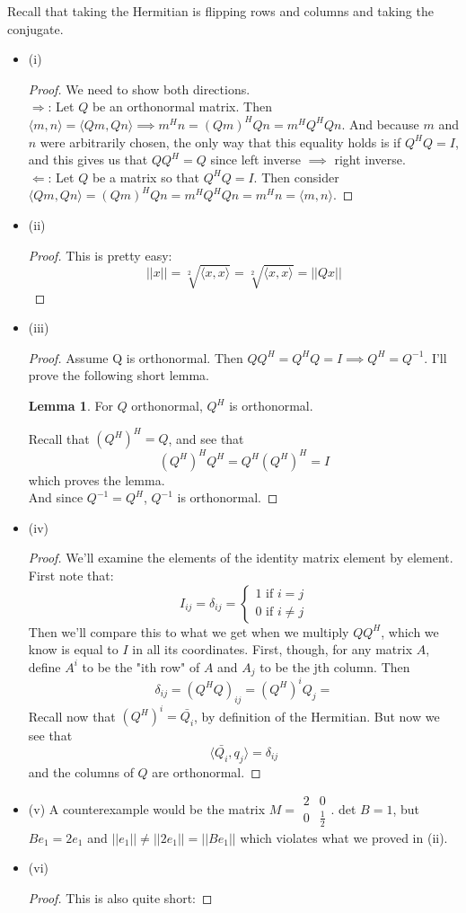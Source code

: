 \documentclass[12pt]{article}
\newenvironment{problem}[2][Problem]{\begin{trivlist}
\item[\hskip \labelsep {\bfseries #1}\hskip \labelsep {\bfseries #2.}]}{\end{trivlist}}
\theoremstyle{definition}
\theoremstyle{definition}
\newtheorem{lemma}{Lemma}[section]
\theoremstyle{definition}
\theoremstyle{definition}
\begin{document}
\begin{problem}{3.10} Recall that taking the Hermitian is flipping rows and columns and taking the conjugate.
\begin{itemize}
\item (i) \begin{proof}
We need to show both directions. \\
$\Rightarrow$: Let $Q$ be an orthonormal matrix. Then $\langle m, n \rangle = \langle Qm, Qn \rangle \implies m^H n = (Qm)^H Qn = m^H Q^H Qn.$ And because $m$ and $n$ were arbitrarily chosen, the only way that this equality holds is if $Q^HQ = I$, and this gives us that $QQ^H = Q$ since left inverse $\implies$ right inverse.  \\
$\Leftarrow$: Let $Q$ be a matrix so that $Q^HQ = I$. Then consider $\langle Qm, Qn \rangle = (Qm)^H Qn = m^HQ^HQn = m^Hn = \langle m, n \rangle$.
\end{proof}
\item (ii)
\begin{proof} This is pretty easy:
$$
||x|| = \sqrt[2]{\langle x, x \rangle} = \sqrt[2]{\langle x, x \rangle} = ||Qx||
$$
\end{proof}
\item (iii) \begin{proof}
Assume Q is orthonormal. Then $QQ^H=Q^HQ = I \implies Q^H = Q^{-1}$. I'll prove the following short lemma.
\begin{lemma} For $Q$ orthonormal, $Q^H$ is orthonormal.
\end{lemma}
Recall that $(Q^H)^H = Q$, and see that 
$$
(Q^H)^HQ^H = Q^H(Q^H)^H = I 
$$ 
which proves the lemma. \\
And since $Q^{-1} = Q^H$, $Q^{-1}$ is orthonormal. 
\end{proof}
\item (iv) 
\begin{proof}
We'll examine the elements of the identity matrix element by element. First note that: 
$$
I_{ij} = \delta_{ij} = \begin{cases} 1 \text{ if } i = j \\ 
0 \text{ if } i \neq j 
\end{cases}
$$ Then we'll compare this to what we get when we multiply $QQ^H$, which we know is equal to $I$ in all its coordinates. First, though, for any matrix $A$, define $A^i$ to be the "ith row" of $A$ and $A_j$ to be the jth column. Then
$$ \delta_{ij} = (Q^HQ)_{ij} = (Q^H)^i Q_j = $$
Recall now that $(Q^H)^i = \bar{Q_i}$, by definition of the Hermitian. But now we see that 
$$\langle \bar{Q_i}, q_j \rangle = \delta_{ij} $$
and the columns of $Q$ are orthonormal.
\end{proof}
\item (v) 
A counterexample would be the matrix $M = \begin{smallmatrix} 2 & 0 \\ 0 & \frac{1}{2} \end{smallmatrix} $. det $B = 1$, but $Be_1 = 2e_1$ and $||e_1|| \neq ||2e_1|| = ||Be_1||$ which violates what we proved in (ii).
\item(vi) \begin{proof}
This is also quite short:


\end{proof}
\end{itemize}
\end{problem}
\end{document}
